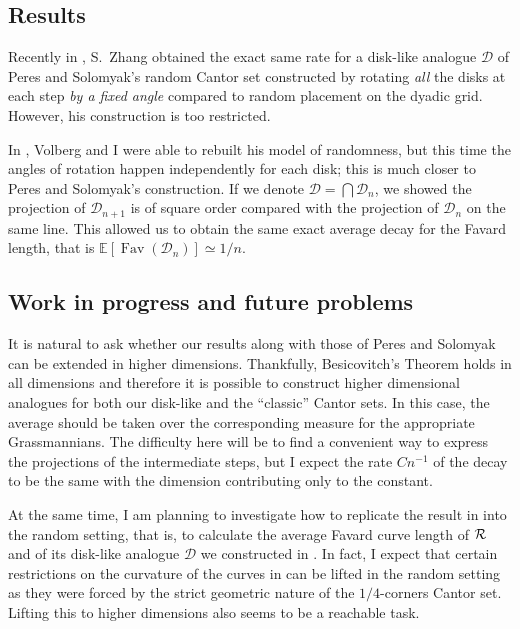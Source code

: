 \documentclass[11pt]{amsart} %
\theoremstyle{remark} %
\theoremstyle{definition} %
\numberwithin{equation}{section} %
\def \E{{\mathbb{E}}}	\def \K{{\mathbb{K}}}	\def \Q{{\mathbb{Q}}}	\def \W{{\mathbb{W}}}
\def \cD{{\mathcal{D}}}	\def \cJ{{\mathcal{J}}}	\def \cP{{\mathcal{P}}}	\def \cV{{\mathcal{V}}}
\newcommand{\0}[1]{\overline{#1}} %
\newcommand{\1}[1]{\tilde{#1}} %
\newcommand{\2}[1]{{}_{|#1}} %
\DeclareMathOperator{\Fav}{Fav} %
\begin{document}
\subsection*{Results}	%
Recently in \cite{Zha2019}, S.~Zhang obtained the exact same rate for a disk-like analogue $\cD$ of Peres and Solomyak's random Cantor set constructed by rotating \emph{all} the disks at each step \emph{by a fixed angle} compared to random placement on the dyadic grid. However, his construction is too restricted.

In \cite{VarVol2022ep}, Volberg and I were able to rebuilt his model of randomness, but this time the angles of rotation happen independently for each disk; this is much closer to Peres and Solomyak's construction. If we denote $\cD=\bigcap\cD_n$, we showed the projection of $\cD_{n+1}$ is of square order compared with the projection of $\cD_n$ on the same line. This allowed us to obtain the same exact average decay for the Favard length, that is $\E[\Fav(\cD_n)]\simeq 1/n$.


\subsection*{Work in progress and future problems}	%
It is natural to ask whether our results along with those of Peres and Solomyak can be extended in higher dimensions. Thankfully, Besicovitch's Theorem \cite{Mat1975} holds in all dimensions and therefore it is possible to construct higher dimensional analogues for both our disk-like and the ``classic'' Cantor sets. In this case, the average should be taken over the corresponding measure for the appropriate Grassmannians. The difficulty here will be to find a convenient way to express the projections of the intermediate steps, but I expect the rate $Cn^{-1}$ of the decay to be the same with the dimension contributing only to the constant.

\smallskip

At the same time, I am planning to investigate how to replicate the result in \cite{ClaDavTay2022} into the random setting, that is, to calculate the average Favard curve length of ${\mathcal{R}}$ and of its disk-like analogue $\cD$ we constructed in \cite{VarVol2022ep}. In fact, I expect that certain restrictions on the curvature of the curves in \cite{ClaDavTay2022} can be lifted in the random setting as they were forced by the strict geometric nature of the $1/4$-corners Cantor set. Lifting this to higher dimensions also seems to be a reachable task.
\end{document}
